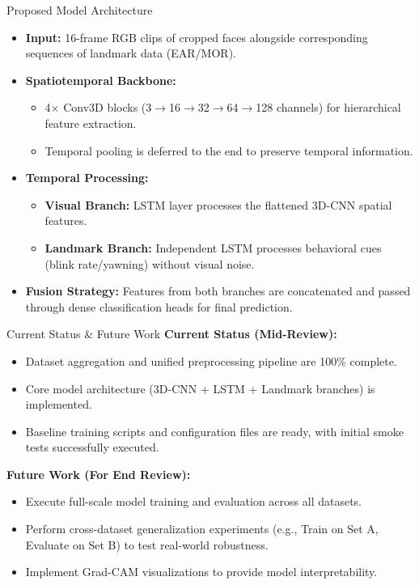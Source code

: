 \documentclass{beamer}
\begin{document}
\begin{frame}{Proposed Model Architecture}
    \begin{itemize}
        \item \textbf{Input:} 16-frame RGB clips of cropped faces alongside corresponding sequences of landmark data (EAR/MOR).
        \item \textbf{Spatiotemporal Backbone:} 
        \begin{itemize}
            \item 4$\times$ Conv3D blocks (3$\to$16$\to$32$\to$64$\to$128 channels) for hierarchical feature extraction.
            \item Temporal pooling is deferred to the end to preserve temporal information.
        \end{itemize}
        \item \textbf{Temporal Processing:}
        \begin{itemize}
            \item \textbf{Visual Branch:} LSTM layer processes the flattened 3D-CNN spatial features.
            \item \textbf{Landmark Branch:} Independent LSTM processes behavioral cues (blink rate/yawning) without visual noise.
        \end{itemize}
        \item \textbf{Fusion Strategy:} Features from both branches are concatenated and passed through dense classification heads for final prediction.
    \end{itemize}
\end{frame}

\begin{frame}{Current Status \& Future Work}
    \textbf{Current Status (Mid-Review):}
    \begin{itemize}
        \item Dataset aggregation and unified preprocessing pipeline are 100\% complete.
        \item Core model architecture (3D-CNN + LSTM + Landmark branches) is implemented.
        \item Baseline training scripts and configuration files are ready, with initial smoke tests successfully executed.
    \end{itemize}
    \vspace{0.3cm}
    
    \textbf{Future Work (For End Review):}
    \begin{itemize}
        \item Execute full-scale model training and evaluation across all datasets.
        \item Perform cross-dataset generalization experiments (e.g., Train on Set A, Evaluate on Set B) to test real-world robustness.
        \item Implement Grad-CAM visualizations to provide model interpretability.
    \end{itemize}
\end{frame}
\end{document}
